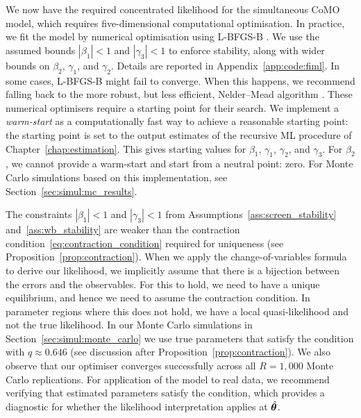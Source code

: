 We now have the required concentrated likelihood for the simultaneous CoMO model, which requires five-dimensional computational optimisation. In practice, we fit the model by numerical optimisation using L-BFGS-B \parencite{Byrd1995}. We use the assumed bounds $|\beta_1| < 1$ and $|\gamma_3| < 1$ to enforce stability, along with wider bounds on $\beta_2$, $\gamma_1$, and $\gamma_2$. Details are reported in Appendix~\ref{app:code:fiml}. In some cases, L-BFGS-B might fail to converge. When this happens, we recommend falling back to the more robust, but less efficient, Nelder--Mead algorithm \parencite{NelderMead1965}. These numerical optimisers require a starting point for their search. We implement a \emph{warm-start} as a computationally fast way to achieve a reasonable starting point: the starting point is set to the output estimates of the recursive ML procedure of Chapter~\ref{chap:estimation}. This gives starting values for $\beta_1$, $\gamma_1$, $\gamma_2$, and $\gamma_3$. For $\beta_2$, we cannot provide a warm-start and start from a neutral point: zero. For Monte Carlo simulations based on this implementation, see Section~\ref{sec:simul:mc_results}.

\begin{remark}
\label{rem:quasi_likelihood}
The constraints $|\beta_1| < 1$ and $|\gamma_3| < 1$ from Assumptions~\ref{ass:screen_stability} and~\ref{ass:wb_stability} are weaker than the contraction condition~\eqref{eq:contraction_condition} required for uniqueness (see Proposition~\ref{prop:contraction}). When we apply the change-of-variables formula to derive our likelihood, we implicitly assume that there is a bijection between the errors and the observables. For this to hold, we need to have a unique equilibrium, and hence we need to assume the contraction condition. In parameter regions where this does not hold, we have a local quasi-likelihood and not the true likelihood. In our Monte Carlo simulations in Section~\ref{sec:simul:monte_carlo} we use true parameters that satisfy the condition with $q \approx 0.646$ (see discussion after Proposition~\ref{prop:contraction}). We also observe that our optimiser converges successfully across all $R = 1{,}000$ Monte Carlo replications. For application of the model to real data, we recommend verifying that estimated parameters satisfy the condition, which provides a diagnostic for whether the likelihood interpretation applies at $\hat{\bm{\theta}}$.
\end{remark}

